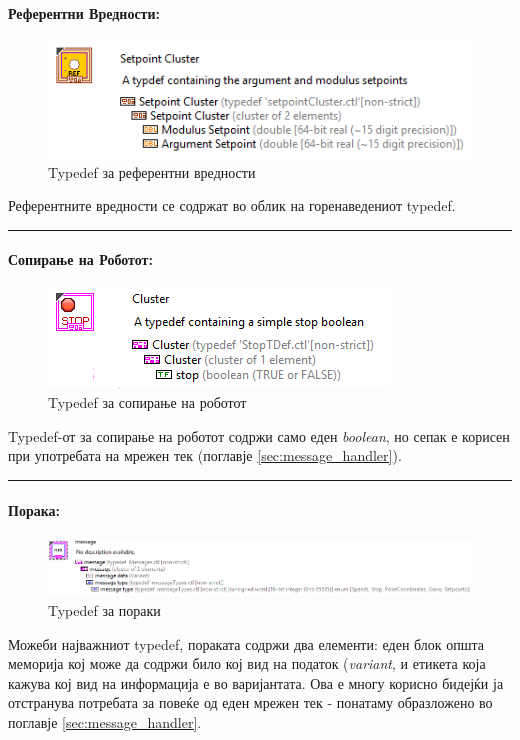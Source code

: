 \documentclass[11pt]{article}
\begin{document}
      \paragraph{Референтни Вредности:\\}
	      \begin{figure}[H]
	        \includegraphics[width=0.55\linewidth]{./images/typedef_setpoints_border.png}
		      \caption{Typedef за референтни вредности}
	        \label{fig:setpoints_typedef}
	        \raggedright
	        \end{figure}
	      Референтните вредности се содржат во облик на горенаведениот typedef.\\
        \textcolor[RGB]{150,150,150}{\rule{\linewidth}{1.6pt}}

      \paragraph{Сопирање на Роботот:\\}
	      \begin{figure}[H]
	        \includegraphics[width=0.55\linewidth]{./images/typedef_stop_border.png}
		      \caption{Typedef за сопирање на роботот}
	        \label{fig:setpoints_typedef}
	        \raggedright
	        \end{figure}
        Typedef-от за сопирање на роботот содржи само еден \textit{boolean}, но сепак е корисен при употребата на мрежен тек (поглавје \ref{sec:message_handler}).\\
        \textcolor[RGB]{150,150,150}{\rule{\linewidth}{1.6pt}}

      \paragraph{Порака:\\}
        \begin{figure}[H]
          \includegraphics[width=0.85\linewidth]{./images/typedef_message.png}
          \caption{Typedef за пораки}
          \label{fig:message_typedef}
          \raggedright
          \end{figure}
        Можеби најважниот typedef, пораката содржи два елементи: еден блок општа меморија кој може да содржи било кој вид на податок (\textit{variant}, и етикета која кажува кој вид на информација е во варијантата. Ова е многу корисно бидејќи ја отстранува потребата за повеќе од еден мрежен тек - понатаму образложено во поглавје \ref{sec:message_handler}.
\end{document}
